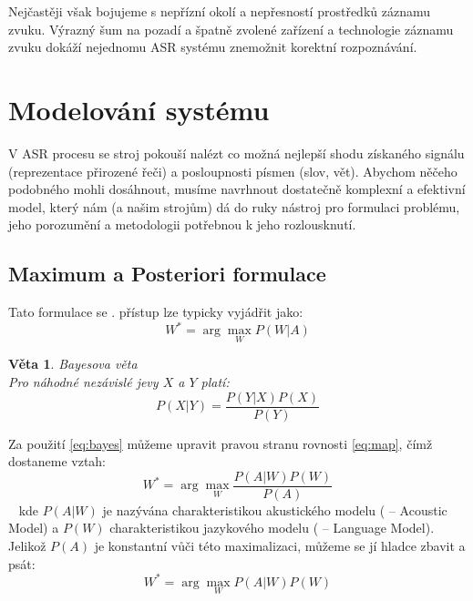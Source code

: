 Nejčastěji však bojujeme s nepřízní okolí a nepřesností prostředků záznamu zvuku. Výrazný šum na pozadí a špatně zvolené zařízení a technologie záznamu zvuku dokáží nejednomu ASR systému znemožnit korektní rozpoznávání.

\section{Modelování systému}

V ASR procesu se stroj pokouší nalézt co možná nejlepší shodu získaného signálu (reprezentace přirozené řeči) a posloupnosti písmen (slov, vět). Abychom něčeho podobného mohli dosáhnout, musíme navrhnout dostatečně komplexní a efektivní model, který nám (a našim strojům) dá do ruky nástroj pro formulaci problému, jeho porozumění a metodologii potřebnou k jeho rozlousknutí.

\subsection{Maximum a Posteriori formulace}

Tato formulace se  \cite{jelinek_2010}.  přístup \cite{bahl_jelinek_1983} lze typicky vyjádřit jako:
%
\begin{equation}
	\label{eq:map}
	W^* = \arg \max_{W} P(W|A)
\end{equation}

\newtheorem{t:bayes}{Věta}
\begin{t:bayes}
Bayesova věta \\
Pro náhodné nezávislé jevy $X$ a $Y$ platí:
\begin{equation}
	\label{eq:bayes}
	P(X|Y) = \frac{P(Y|X) P(X)}{P(Y)}
\end{equation}
\end{t:bayes}

Za použití \ref{eq:bayes} můžeme upravit pravou stranu rovnosti \ref{eq:map}, čímž dostaneme vztah:
%
\begin{equation}
	\label{eq:map2}
	W^* = \arg \max_{W} \frac{P(A|W) P(W)}{P(A)}
\end{equation}\
%
kde $P(A|W)$ je nazývána charakteristikou akustického modelu ( -- Acoustic Model) a $P(W)$ charakteristikou jazykového modelu ( -- Language Model). Jelikož $P(A)$ je konstantní vůči této maximalizaci, můžeme se jí hladce zbavit a psát:
%
\begin{equation}
	\label{eq:map3}
	W^* = \arg \max_{W} P(A|W) P(W)
\end{equation}


